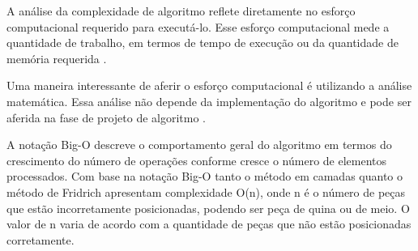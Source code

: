 A análise da complexidade de algoritmo reflete diretamente no esforço computacional requerido para executá-lo. Esse esforço computacional mede a quantidade de trabalho, em termos de tempo de execução ou da quantidade de memória requerida \cite{toscale}.

Uma maneira interessante de aferir o esforço computacional é utilizando a análise matemática. Essa análise não depende da implementação do algoritmo e pode ser aferida na fase de projeto de algoritmo \cite{toscale}.

A notação Big-O descreve o comportamento geral do algoritmo em termos do crescimento do número de operações conforme cresce o número de elementos processados. Com base na notação Big-O tanto o método em camadas quanto o método de Fridrich apresentam complexidade O(n), onde n é o número de peças que estão incorretamente posicionadas, podendo ser peça de quina ou de meio. O valor de n varia de acordo com a quantidade de peças que não estão posicionadas corretamente.
